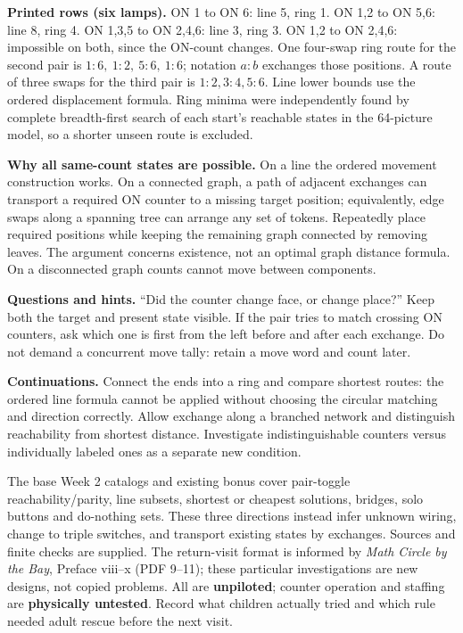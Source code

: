 \textbf{Printed rows (six lamps).} ON 1 to ON 6: line 5, ring 1. ON 1,2 to ON 5,6: line 8, ring 4. ON 1,3,5 to ON 2,4,6: line 3, ring 3. ON 1,2 to ON 2,4,6: impossible on both, since the ON-count changes. One four-swap ring route for the second pair is $1\!:\!6,\ 1\!:\!2,\ 5\!:\!6,\ 1\!:\!6$; notation $a:b$ exchanges those positions. A route of three swaps for the third pair is $1:2,3:4,5:6$. Line lower bounds use the ordered displacement formula. Ring minima were independently found by complete breadth-first search of each start's reachable states in the 64-picture model, so a shorter unseen route is excluded.

\textbf{Why all same-count states are possible.} On a line the ordered movement construction works. On a connected graph, a path of adjacent exchanges can transport a required ON counter to a missing target position; equivalently, edge swaps along a spanning tree can arrange any set of tokens. Repeatedly place required positions while keeping the remaining graph connected by removing leaves. The argument concerns existence, not an optimal graph distance formula. On a disconnected graph counts cannot move between components.

\textbf{Questions and hints.} ``Did the counter change face, or change place?'' Keep both the target and present state visible. If the pair tries to match crossing ON counters, ask which one is first from the left before and after each exchange. Do not demand a concurrent move tally: retain a move word and count later.

\textbf{Continuations.} Connect the ends into a ring and compare shortest routes: the ordered line formula cannot be applied without choosing the circular matching and direction correctly. Allow exchange along a branched network and distinguish reachability from shortest distance. Investigate indistinguishable counters versus individually labeled ones as a separate new condition.

The base Week 2 catalogs and existing bonus cover pair-toggle reachability/parity, line subsets, shortest or cheapest solutions, bridges, solo buttons and do-nothing sets. These three directions instead infer unknown wiring, change to triple switches, and transport existing states by exchanges. Sources and finite checks are supplied. The return-visit format is informed by \emph{Math Circle by the Bay}, Preface viii--x (PDF 9--11); these particular investigations are new designs, not copied problems. All are \textbf{unpiloted}; counter operation and staffing are \textbf{physically untested}. Record what children actually tried and which rule needed adult rescue before the next visit.
